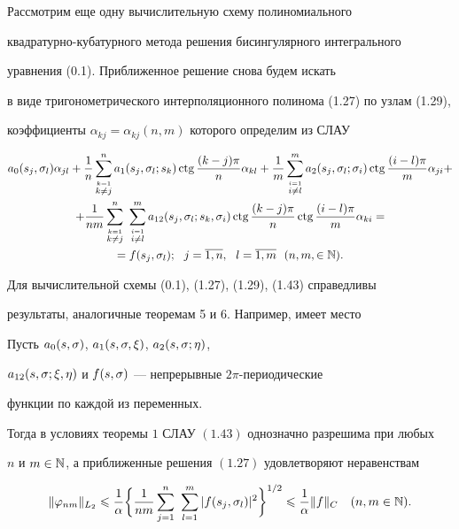 Рассмотрим еще одну вычислительную схему полиномиального 


квадратурно-кубатурного метода решения бисингулярного интегрального 


уравнения (0.1). Приближенное решение снова будем искать 


в виде тригонометрического интерполяционного полинома (1.27) по узлам (1.29), 


коэффициенты $\alpha_{kj} = \alpha_{kj}(n,m)$ которого определим из СЛАУ 


\begin{gather}


a_0(s_j,\si_l)\alpha_{jl}+\frac{1}{n}


\sum_{\overset{k=1}{k\ne j}}^n a_1(s_j,\si_l;s_k)\ctg


\frac{(k-j)\pi}{n}\alpha_{kl}+


\frac{1}{m}\sum_{\overset{i=1}{i\ne l}}^m a_2(s_j,\si_l;\si_i)\ctg


\frac{(i-l)\pi}{m}\alpha_{ji}+ \notag \\


%


+\frac{1}{nm}\sum_{\overset{k=1}{k\ne j}}^{n}


\ \sum_{\overset{i=1}{i\ne l}}^m a_{12}(s_j,\si_l;s_k,\si_i)\ctg


\frac{(k-j)\pi}{n}\ctg \frac{(i-l)\pi}{m}\alpha_{ki}= \notag \\


=f(s_j,\si_l);\ \ j=\ol{1,n},\ \ l=\ol{1,m}\ \ (n,m,\in \N).


\end{gather}





Для вычислительной схемы (0.1), (1.27), (1.29), (1.43) справедливы 


результаты, аналогичные теоремам 5 и 6. Например, имеет место





\begin{thm}


Пусть $a_0(s,\sigma)$, $a_1(s,\sigma,\xi)$, $a_2(s,\sigma;\eta)$, 


$a_{12}(s,\sigma;\xi,\eta)$ и $f(s,\sigma)$ --- непрерывные $2\pi$-периодические 


функции по каждой из переменных.  


Тогда в условиях теоремы $1$ СЛАУ $(1.43)$ однозначно разрешима при любых 


$n$ и $m\in \Bbb N$, а приближенные решения $(1.27)$ удовлетворяют неравенствам


\begin{equation}


\|\vp_{nm}\|_{L_2}\lea \frac{1}{\alpha}\bigg\{\frac{1}{nm}


\sum_{j=1}^n\ \sum_{l=1}^m|f(s_j,\si_l)|^2\bigg\}^{1/2}\lea


\frac{1}{\alpha}\|f\|_C\quad (n,m\in\N).


\end{equation}


\end{thm}





